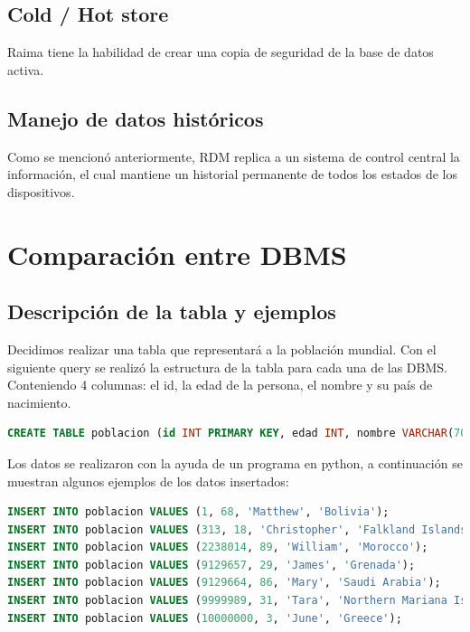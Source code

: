 \documentclass{acmart}
\begin{document}
\subsection{Cold / Hot store}
Raima tiene la habilidad de crear una copia de seguridad de la base de datos activa. \cite{Rserv}
\subsection{Manejo de datos históricos}
Como se mencionó anteriormente, RDM replica a un sistema de control central la información, el cual mantiene un historial permanente de todos los estados de los dispositivos. \cite{Rwiki}

\newpage

\section{Comparación entre DBMS}
\subsection{Descripción de la tabla y ejemplos}
Decidimos realizar una tabla que representará a la población mundial. Con el siguiente query se realizó la estructura de la tabla para cada una de las DBMS. Conteniendo 4 columnas: el id, la edad de la persona, el nombre y su país de nacimiento. \\

\begin{lstlisting}[language=sql]
CREATE TABLE poblacion (id INT PRIMARY KEY, edad INT, nombre VARCHAR(70), pais VARCHAR(100));
\end{lstlisting}



Los datos se realizaron con la ayuda de un programa en python, a continuación se muestran algunos ejemplos de los datos insertados:

\begin{lstlisting}[language=sql]
INSERT INTO poblacion VALUES (1, 68, 'Matthew', 'Bolivia');
INSERT INTO poblacion VALUES (313, 18, 'Christopher', 'Falkland Islands (Malvinas)');
INSERT INTO poblacion VALUES (2238014, 89, 'William', 'Morocco');
INSERT INTO poblacion VALUES (9129657, 29, 'James', 'Grenada');
INSERT INTO poblacion VALUES (9129664, 86, 'Mary', 'Saudi Arabia');
INSERT INTO poblacion VALUES (9999989, 31, 'Tara', 'Northern Mariana Islands');
INSERT INTO poblacion VALUES (10000000, 3, 'June', 'Greece');
\end{lstlisting}
\end{document}
